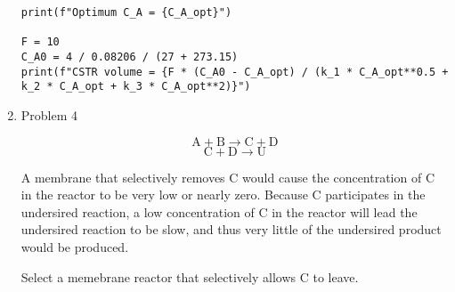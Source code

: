 \documentclass[12pt]{article}
\begin{document}
\begin{enumerate}
\begin{verbatim}
print(f"Optimum C_A = {C_A_opt}")

F = 10 
C_A0 = 4 / 0.08206 / (27 + 273.15)
print(f"CSTR volume = {F * (C_A0 - C_A_opt) / (k_1 * C_A_opt**0.5 + k_2 * C_A_opt + k_3 * C_A_opt**2)}")
\end{verbatim}
    
\newpage
    \item Problem 4
    
    \[
        \mathrm{A} + \mathrm{B} \rightarrow \mathrm{C} + \mathrm{D} 
    \]
    \[
        \mathrm{C} + \mathrm{D} \rightarrow \mathrm{U} 
    \]

    A membrane that selectively removes C would cause the concentration of C in the reactor to be very low or nearly zero. Because C participates in the undersired reaction, a low concentration of C in the reactor will lead the undersired reaction to be slow, and thus very little of the undersired product would be produced.

    Select a memebrane reactor that selectively allows C to leave.
    

\end{enumerate}
\end{document}

